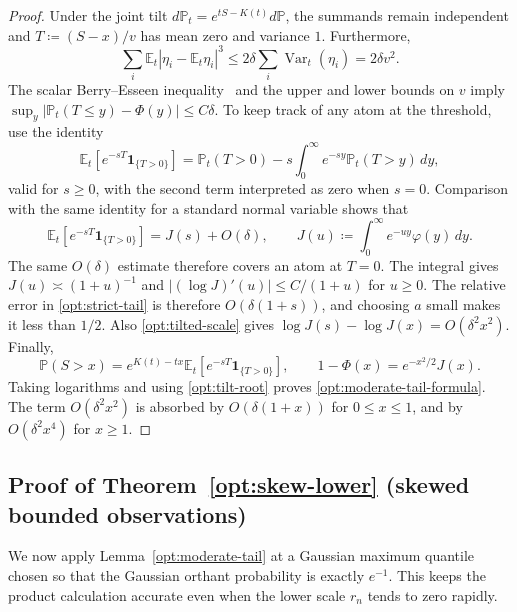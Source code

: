 \documentclass[11pt,letterpaper]{article}
\theoremstyle{remark}
\newcommand{\E}{\mathbb E}
\newcommand{\Pp}{\mathbb P}
\newcommand{\Var}{\operatorname{Var}}
\newcommand{\ind}{\mathbf 1}
\begin{document}
\begin{proof}
Under the joint tilt
\(d\Pp_t=e^{tS-K(t)}d\Pp\), the summands remain independent and
\(T\coloneqq(S-x)/v\) has mean zero and variance \(1\). Furthermore,
\[
 \sum_i\E_t|\eta_i-\E_t\eta_i|^3
 \le2\delta\sum_i\Var_t(\eta_i)=2\delta v^2.
\]
The scalar Berry--Esseen inequality~\cite{Berry1941} and the upper and lower bounds on \(v\) imply
\(\sup_y|\Pp_t(T\le y)-\Phi(y)|\le C\delta\).
To keep track of any atom at the threshold, use the identity
\[
 \E_t[e^{-sT}\ind_{\{T>0\}}]
 =\Pp_t(T>0)-s\int_0^\infty e^{-sy}\Pp_t(T>y)\,dy,
\]
valid for \(s\ge0\), with the second term interpreted as zero when
\(s=0\). Comparison with
the same identity for a standard normal variable shows that
\begin{equation}
 \E_t[e^{-sT}\ind_{\{T>0\}}]=J(s)+O(\delta),\qquad
 J(u)\coloneqq\int_0^\infty e^{-uy}\varphi(y)\,dy.
 \label{opt:strict-tail}
\end{equation}
The same \(O(\delta)\) estimate therefore covers an atom at \(T=0\).
The integral gives \(J(u)\asymp(1+u)^{-1}\) and
\(|(\log J)'(u)|\le C/(1+u)\) for \(u\ge0\).
The relative error in \eqref{opt:strict-tail} is therefore
\(O(\delta(1+s))\), and choosing \(a\) small makes it less than \(1/2\).
Also \eqref{opt:tilted-scale} gives
\(\log J(s)-\log J(x)=O(\delta^2x^2)\).
Finally,
\[
 \Pp(S>x)=e^{K(t)-tx}\E_t[e^{-sT}\ind_{\{T>0\}}],\qquad
 1-\Phi(x)=e^{-x^2/2}J(x).
\]
Taking logarithms and using \eqref{opt:tilt-root} proves
\eqref{opt:moderate-tail-formula}. The term \(O(\delta^2x^2)\) is
absorbed by \(O(\delta(1+x))\) for \(0\le x\le1\), and by
\(O(\delta^2x^4)\) for \(x\ge1\).
\end{proof}


\subsection{Proof of Theorem~\ref*{opt:skew-lower} (skewed bounded observations)}

\label{app:skew-proof}
We now apply Lemma~\ref{opt:moderate-tail} at a Gaussian maximum
quantile chosen so that the Gaussian orthant probability is exactly
\(e^{-1}\). This keeps the product calculation accurate even when
the lower scale \(r_n\) tends to zero rapidly.
\end{document}
